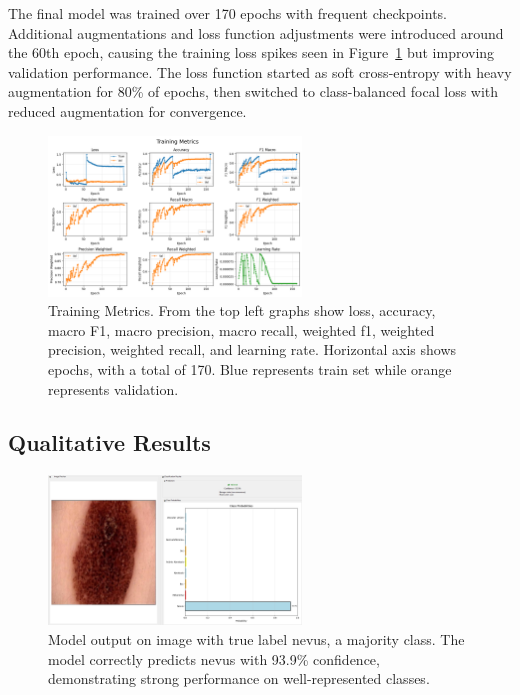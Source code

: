 \documentclass{article} %
\begin{document}
The final model was trained over 170 epochs with frequent checkpoints. Additional augmentations and loss function adjustments were introduced around the 60th epoch, causing the training loss spikes seen in Figure~\ref{fig:training_metrics} but improving validation performance. The loss function started as soft cross-entropy with heavy augmentation for 80\% of epochs, then switched to class-balanced focal loss with reduced augmentation for convergence.


\begin{figure}[H]
\begin{center}
\includegraphics[width=0.6\textwidth]{Figs/training_metrics.png}
\end{center}
\caption{Training Metrics. From the top left graphs show loss, accuracy, macro F1, macro precision, macro recall, weighted f1, weighted precision, weighted recall, and learning rate. Horizontal axis shows epochs, with a total of 170. Blue represents train set while orange represents validation.}
\label{fig:training_metrics}
\end{figure}


\subsection{Qualitative Results}

\begin{figure}[H]
\begin{center}
\includegraphics[width=0.6\textwidth]{Figs/nevus_prediction.png}
\end{center}
\caption{Model output on image with true label nevus, a majority class. The model correctly predicts nevus with 93.9\% confidence, demonstrating strong performance on well-represented classes.}
\label{fig:qual1}
\end{figure}
\end{document}
